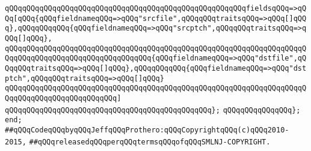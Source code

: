 \verb|qQQqqQQqqQQqqQQqqQQqqQQqqQQqqQQqqQQqqQQqqQQqqQQqqQQqqQQqfieldsqQQq=>qQQq[qQQq{qQQqfieldnameqQQq=>qQQq"srcfile",qQQqqQQqtraitsqQQq=>qQQq[]qQQq},qQQqqQQqqQQq{qQQqfieldnameqQQq=>qQQq"srcptch",qQQqqQQqtraitsqQQq=>qQQq[]qQQq},|\newline
\verb|qQQqqQQqqQQqqQQqqQQqqQQqqQQqqQQqqQQqqQQqqQQqqQQqqQQqqQQqqQQqqQQqqQQqqQQqqQQqqQQqqQQqqQQqqQQqqQQqqQQqqQQq{qQQqfieldnameqQQq=>qQQq"dstfile",qQQqqQQqtraitsqQQq=>qQQq[]qQQq},qQQqqQQqqQQq{qQQqfieldnameqQQq=>qQQq"dstptch",qQQqqQQqtraitsqQQq=>qQQq[]qQQq}|\newline
\verb|qQQqqQQqqQQqqQQqqQQqqQQqqQQqqQQqqQQqqQQqqQQqqQQqqQQqqQQqqQQqqQQqqQQqqQQqqQQqqQQqqQQqqQQqqQQqqQQq]|\newline
\verb|qQQqqQQqqQQqqQQqqQQqqQQqqQQqqQQqqQQqqQQqqQQqqQQq};|\newline
\newline
\verb|qQQqqQQqqQQqqQQq};|\newline
\verb|end;|\newline
\newline
\newline
\verb|##qQQqCodeqQQqbyqQQqJeffqQQqProthero:qQQqCopyrightqQQq(c)qQQq2010-2015,|\newline
\verb|##qQQqreleasedqQQqperqQQqtermsqQQqofqQQqSMLNJ-COPYRIGHT.|\newline

